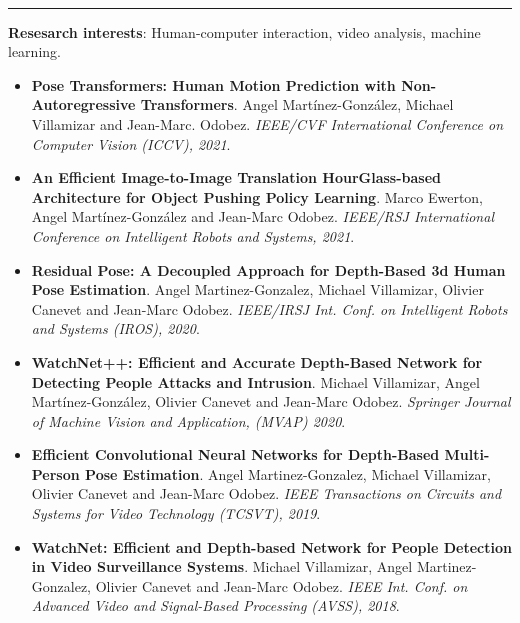 \documentclass[10 pt]{article}
\newcommand{\mypartitle}[2][2.]{\vspace*{-#1 ex}~\\{\noindent {\bf #2}}}
\begin{document}

\mypartitle{Research and Publications}
\medskip
\hrule height 0.05cm
\medskip

\textbf{Resesarch interests}: Human-computer interaction, video analysis, machine learning.

\begin{itemize}[noitemsep]

\item \textbf{Pose Transformers: Human Motion Prediction with Non-Autoregressive Transformers}.
Angel Mart\'inez-Gonz\'alez, Michael Villamizar and Jean-Marc. Odobez.
\textit{IEEE/CVF International Conference on Computer Vision (ICCV), 2021}.
\vspace{.05cm}

\item \textbf{An Efficient Image-to-Image Translation HourGlass-based Architecture for Object Pushing Policy Learning}.
Marco Ewerton, Angel Martínez-González and Jean-Marc Odobez.
\textit{IEEE/RSJ International Conference on Intelligent Robots and Systems, 2021}.
\vspace{.05cm}

\item \textbf{Residual Pose: A Decoupled Approach for Depth-Based 3d Human Pose Estimation}.
Angel Martinez-Gonzalez, Michael Villamizar, Olivier Canevet and Jean-Marc Odobez.
\textit{IEEE/IRSJ Int. Conf. on Intelligent Robots and Systems (IROS), 2020}.
\vspace{.05cm}
%

\item \textbf{WatchNet++: Efficient and Accurate Depth-Based Network for Detecting People Attacks and Intrusion}.
Michael Villamizar, Angel Mart\'inez-Gonz\'alez, Olivier Canevet and Jean-Marc Odobez.
\textit{Springer Journal of Machine Vision and Application, (MVAP) 2020}.
\vspace{.05cm}
%

\item \textbf{Efficient Convolutional Neural Networks for Depth-Based Multi-Person Pose Estimation}. 
Angel Martinez-Gonzalez, Michael Villamizar, Olivier Canevet and Jean-Marc Odobez.
\textit{IEEE Transactions on Circuits and Systems for Video Technology (TCSVT), 2019}.
\vspace{.05cm}
%

\item \textbf{WatchNet: Efficient and Depth-based Network for People Detection in Video Surveillance Systems}.
Michael Villamizar, Angel Martinez-Gonzalez, Olivier Canevet and Jean-Marc Odobez.
\textit{IEEE Int. Conf. on Advanced Video and Signal-Based Processing (AVSS), 2018}.
\vspace{.05cm}
%


\end{itemize}
\end{document}
